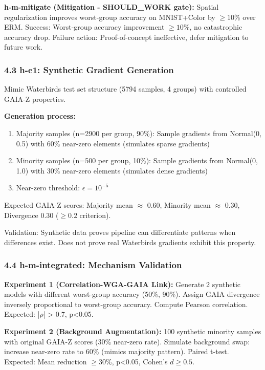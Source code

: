 \textbf{h-m-mitigate (Mitigation - SHOULD\_WORK gate):} Spatial regularization improves worst-group accuracy on MNIST+Color by $\geq 10$\% over ERM. Success: Worst-group accuracy improvement $\geq 10$\%, no catastrophic accuracy drop. Failure action: Proof-of-concept ineffective, defer mitigation to future work.

\subsubsection{4.3 h-e1: Synthetic Gradient Generation}

Mimic Waterbirds test set structure (5794 samples, 4 groups) with controlled GAIA-Z properties.

\textbf{Generation process:}  
\begin{enumerate}
\item Majority samples (n=2900 per group, 90\%): Sample gradients from Normal(0, 0.5) with 60\% near-zero elements (simulates sparse gradients)
\item Minority samples (n=500 per group, 10\%): Sample gradients from Normal(0, 1.0) with 30\% near-zero elements (simulates dense gradients)
\item Near-zero threshold: $\epsilon = 10^{-5}$
\end{enumerate}

Expected GAIA-Z scores: Majority mean $\approx$ 0.60, Minority mean $\approx$ 0.30, Divergence 0.30 ($\geq 0.2$ criterion).

Validation: Synthetic data proves pipeline can differentiate patterns when differences exist. Does not prove real Waterbirds gradients exhibit this property.

\subsubsection{4.4 h-m-integrated: Mechanism Validation}

\textbf{Experiment 1 (Correlation-WGA-GAIA Link):} Generate 2 synthetic models with different worst-group accuracy (50\%, 90\%). Assign GAIA divergence inversely proportional to worst-group accuracy. Compute Pearson correlation. Expected: |$\rho$| > 0.7, p<0.05.

\textbf{Experiment 2 (Background Augmentation):} 100 synthetic minority samples with original GAIA-Z scores (30\% near-zero rate). Simulate background swap: increase near-zero rate to 60\% (mimics majority pattern). Paired t-test. Expected: Mean reduction $\geq 30$\%, p<0.05, Cohen's $d\geq 0.5$.

